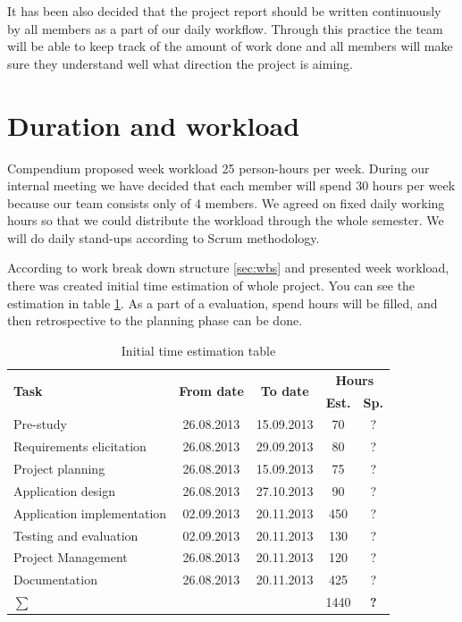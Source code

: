 It has been also decided that the project report should be written continuously by all members as a part of our daily workflow. Through this practice the team will be able to keep track of the amount of work done and all members will make sure they understand well what direction the project is aiming.

\section{Duration and workload}
Compendium proposed week workload 25 person-hours per week. 
During our internal meeting we have decided that each member will spend 30 hours per week because our team consists only of 4 members. 
We agreed on fixed daily working hours so that we could distribute the workload through the whole semester.
We will do daily stand-ups according to Scrum methodology.

According to work break down structure \ref{sec:wbs} and presented week workload, there was created initial time estimation of whole project. 
You can see the estimation in table \ref{tab:initial-time-estimation}. 
As a part of a evaluation, spend hours will be filled, and then retrospective to the planning phase can be done.

\begin{table}[!h]
	\caption{Initial time estimation table}
	\label{tab:initial-time-estimation}
	\def\arraystretch{1.25}
	\begin{tabularx}{\textwidth}{Xcccc}
		\toprule[1mm]
		\multirow{2}{*}{\textbf{Task}} &
		\multirow{2}{*}{\textbf{From date}} & 
		\multirow{2}{*}{\textbf{To date}} & 
		\multicolumn{2}{c}{\textbf{Hours}} \\
 				& & & \textbf{Est.} & \textbf{Sp.} \\
		\midrule
		Pre-study 					& 26.08.2013 & 15.09.2013 & 70 &  ?\\
		Requirements elicitation 	& 26.08.2013 & 29.09.2013 & 80 &  ?\\
		Project planning			& 26.08.2013 & 15.09.2013 &	75 &  ?\\
		Application design 			& 26.08.2013 & 27.10.2013 & 90 &  ?\\
		Application implementation	& 02.09.2013 & 20.11.2013 &	450 &  ?\\
		Testing and evaluation 		& 02.09.2013 & 20.11.2013 & 130 &	?\\
		Project Management  		& 26.08.2013 & 20.11.2013 & 120 &  ?\\
		Documentation				& 26.08.2013 & 20.11.2013 &	425 &  ?\\
		\midrule		
		\textbf{$\sum$}	& &	&		1440	& \textbf{?} \\								
		\bottomrule[1mm]
	\end{tabularx}
\end{table}


